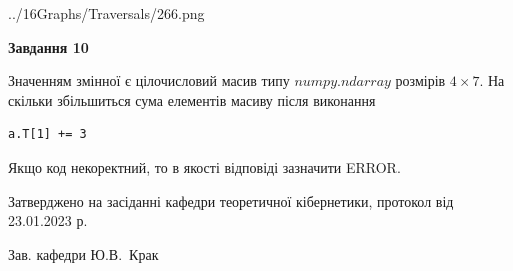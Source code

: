 \documentclass[12pt, ukrainian]{article}
\begin{document}
{\begin {large}
\begin{center}
	{../16Graphs/Traversals/266.png}
\end{center}\par
\newpage

{\begin {center}\textbf{Завдання 10}\end {center}}\par
Значенням змінної  є цілочисловий масив типу $numpy.ndarray$ розмірів $4{\times}7$. На скільки збільшиться сума елементів масиву  після виконання
\begin{verbatim}
a.T[1] += 3
\end{verbatim}


Якщо код некоректний, то в якості відповіді зазначити ERROR.\par
\newpage


\end {large}
}
{\smallskip \begin {small} Затверджено на засіданні кафедри теоретичної кібернетики, протокол  від   23.01.2023 р.\par\smallskip\smallskip
{\parbox {6.5 cm}{Зав. кафедри \dotfill Ю.В.~Крак}} \end{small}}
\end{document}
